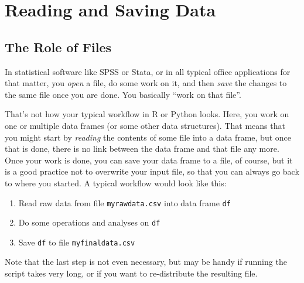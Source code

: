 



\section{Reading and Saving Data}
\label{sec:reading}

\subsection{The Role of Files}\label{sec:files}

In statistical software like SPSS or Stata, or in all typical office applications for that matter, you \emph{open} a file, do some work on it, and then \emph{save} the changes to the same file once you are done. You basically ``work on that file''.

That's not how your typical workflow in R or Python looks.
Here, you work on one or multiple data frames (or some other data structures).
That means that you might start by \emph{reading} the contents of some file into a data frame,
but once that is done, there is no link between the data frame and that file any more.
Once your work is done, you can save your data frame to a file, of course,
but it is a good practice not to overwrite your input file, so that you can always go back to where you started.
A typical workflow would look like this:

\begin{enumerate}
\item Read raw data from file \texttt{\small{myrawdata.csv}} into data frame \texttt{\small{df}}
\item Do some operations and analyses on \texttt{\small{df}}
\item Save \texttt{\small{df}} to file \texttt{\small{myfinaldata.csv}}
\end{enumerate}
Note that the last step is not even necessary, but may be handy if running the script takes very long, or if you want to re-distribute the resulting file.

